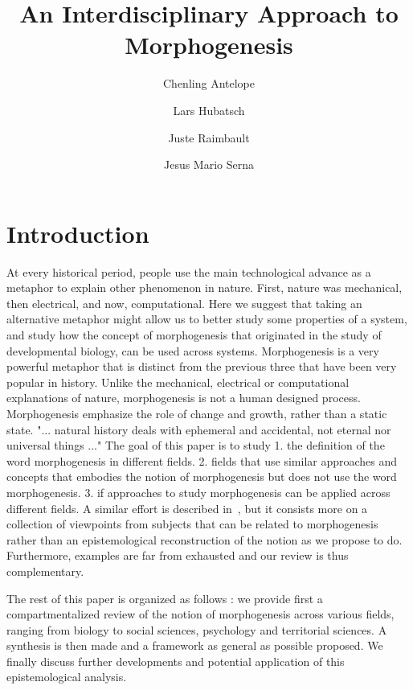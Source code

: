 \documentclass[fleqn,10pt]{wlscirep}
\title{An Interdisciplinary Approach to Morphogenesis}
\author[1]{Chenling Antelope}
\author[2]{Lars Hubatsch}
\author[3]{Juste Raimbault}
\author[4]{Jesus Mario Serna}
\affil[1]{Affiliation, department, city, postcode, country}
\affil[2]{Affiliation, department, city, postcode, country}
\affil[*]{corresponding.author@email.example}
\begin{document}
\flushbottom
\maketitle

\thispagestyle{empty}



\section*{Introduction}

At every historical period, people use the main technological advance as a metaphor to explain other phenomenon in nature. First, nature was mechanical, then electrical, and now, computational. Here we suggest that taking an alternative metaphor might allow us to better study some properties of a system, and study how the concept of morphogenesis that originated in the study of developmental biology, can be used across systems. Morphogenesis is a very powerful metaphor that is distinct from the previous three that have been very popular in history. Unlike the mechanical, electrical or computational explanations of nature, morphogenesis is not a human designed process. Morphogenesis emphasize the role of change and growth, rather than a static state. "... natural history deals with ephemeral and accidental, not eternal nor universal things ..." \cite{thompson1942growth} The goal of this paper is to study 1. the definition of the word morphogenesis in different fields. 2. fields that use similar approaches and concepts that embodies the notion of morphogenesis but does not use the word morphogenesis. 3. if approaches to study morphogenesis can be applied across different fields. A similar effort is described in~\cite{bourgine2010morphogenesis}, but it consists more on a collection of viewpoints from subjects that can be related to morphogenesis rather than an epistemological reconstruction of the notion as we propose to do. Furthermore, examples are far from exhausted and our review is thus complementary.

The rest of this paper is organized as follows : we provide first a compartmentalized review of the notion of morphogenesis across various fields, ranging from biology to social sciences, psychology and territorial sciences. A synthesis is then made and a framework as general as possible proposed. We finally discuss further developments and potential application of this epistemological analysis.


\end{document}
